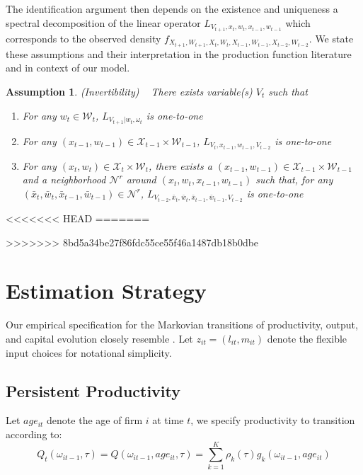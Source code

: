 \documentclass{article}
\newtheorem{assump}{Assumption}[section]
\begin{document}
The identification argument then depends on the existence and uniqueness a spectral decomposition of the linear operator $L_{V_{t+1},x_{t}, w_{t}, x_{t-1}, w_{t-1}}$ which corresponds to the observed density $f_{X_{t+1}, W_{t+1}, X_{t}, W_{t}, X_{t-1}, W_{t-1}, X_{t-2}, W_{t-2}}$. We state these assumptions and their interpretation in the production function literature and in context of our model.

\begin{assump}(Invertibility)
~
There exists variable(s) $V_{t}$ such that
    \begin{enumerate}[label=\alph*)]
    \item For any $w_{t}\in \mathcal{W}_{t}$, $L_{V_{t+1}|w_{t}, \omega_{t}}$ is one-to-one
    \item For any $(x_{t-1}, w_{t-1})\in \mathcal{X}_{t-1}\times\mathcal{W}_{t-1}$, $L_{V_{t}, x_{t-1}, w_{t-1}, V_{t-2}}$ is one-to-one
    \item For any $(x_{t}, w_{t})\in \mathcal{X}_{t}\times\mathcal{W}_{t}$, there exists a $(x_{t-1}, w_{t-1})\in \mathcal{X}_{t-1}\times\mathcal{W}_{t-1}$ and a neighborhood $\mathcal{N}^{r}$ around $(x_{t}, w_{t}, x_{t-1}, w_{t-1})$ such that, for any $(\bar{x}_{t}, \bar{w}_{t}, \bar{x}_{t-1}, \bar{w}_{t-1})\in \mathcal{N}^{r}$, $L_{V_{t-2}, \bar{x}_{t}, \bar{w}_{t}, \bar{x}_{t-1}, \bar{w}_{t-1}, V_{t-2}}$ is one-to-one
    \end{enumerate}
\end{assump}
<<<<<<< HEAD
=======

>>>>>>> 8bd5a34be27f86fdc55ce55f46a1487db18b0dbe



\section{Estimation Strategy}

Our empirical specification for the Markovian transitions of productivity, output, and capital evolution closely resemble \cite{Arellano2017}. Let $z_{it}=(l_{it}, m_{it})$ denote the flexible input choices for notational simplicity.

\subsection{Persistent Productivity}
Let $age_{it}$ denote the age of firm $i$ at time $t$, we specify productivity to transition according to:
\begin{equation}\label{omegamodel}
Q_{t}(\omega_{it-1}, \tau)=Q(\omega_{it-1}, age_{it}, \tau)=\sum_{k=1}^{K}\rho_{k}(\tau)g_{k}(\omega_{it-1}, age_{it})
\end{equation}
\end{document}
